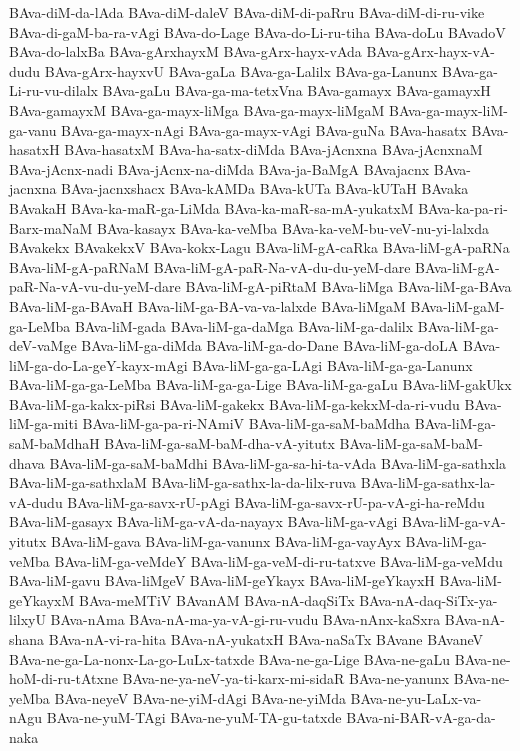 {BAva-diM-da-lAda
BAva-diM-daleV
BAva-diM-di-paRru
BAva-diM-di-ru-vike
BAva-di-gaM-ba-ra-vAgi
BAva-do-Lage
BAva-do-Li-ru-tiha
BAva-doLu
BAvadoV
BAva-do-lalxBa
BAva-gArxhayxM
BAva-gArx-hayx-vAda
BAva-gArx-hayx-vA-dudu
BAva-gArx-hayxvU
BAva-gaLa
BAva-ga-Lalilx
BAva-ga-Lanunx
BAva-ga-Li-ru-vu-dilalx
BAva-gaLu
BAva-ga-ma-tetxVna
BAva-gamayx
BAva-gamayxH
BAva-gamayxM
BAva-ga-mayx-liMga
BAva-ga-mayx-liMgaM
BAva-ga-mayx-liM-ga-vanu
BAva-ga-mayx-nAgi
BAva-ga-mayx-vAgi
BAva-guNa
BAva-hasatx
BAva-hasatxH
BAva-hasatxM
BAva-ha-satx-diMda
BAva-jAcnxna
BAva-jAcnxnaM
BAva-jAcnx-nadi
BAva-jAcnx-na-diMda
BAva-ja-BaMgA
BAvajacnx
BAva-jacnxna
BAva-jacnxshacx
BAva-kAMDa
BAva-kUTa
BAva-kUTaH
BAvaka
BAvakaH
BAva-ka-maR-ga-LiMda
BAva-ka-maR-sa-mA-yukatxM
BAva-ka-pa-ri-Barx-maNaM
BAva-kasayx
BAva-ka-veMba
BAva-ka-veM-bu-veV-nu-yi-lalxda
BAvakekx
BAvakekxV
BAva-kokx-Lagu
BAva-liM-gA-caRka
BAva-liM-gA-paRNa
BAva-liM-gA-paRNaM
BAva-liM-gA-paR-Na-vA-du-du-yeM-dare
BAva-liM-gA-paR-Na-vA-vu-du-yeM-dare
BAva-liM-gA-piRtaM
BAva-liMga
BAva-liM-ga-BAva
BAva-liM-ga-BAvaH
BAva-liM-ga-BA-va-va-lalxde
BAva-liMgaM
BAva-liM-gaM-ga-LeMba
BAva-liM-gada
BAva-liM-ga-daMga
BAva-liM-ga-dalilx
BAva-liM-ga-deV-vaMge
BAva-liM-ga-diMda
BAva-liM-ga-do-Dane
BAva-liM-ga-doLA
BAva-liM-ga-do-La-geY-kayx-mAgi
BAva-liM-ga-ga-LAgi
BAva-liM-ga-ga-Lanunx
BAva-liM-ga-ga-LeMba
BAva-liM-ga-ga-Lige
BAva-liM-ga-gaLu
BAva-liM-gakUkx
BAva-liM-ga-kakx-piRsi
BAva-liM-gakekx
BAva-liM-ga-kekxM-da-ri-vudu
BAva-liM-ga-miti
BAva-liM-ga-pa-ri-NAmiV
BAva-liM-ga-saM-baMdha
BAva-liM-ga-saM-baMdhaH
BAva-liM-ga-saM-baM-dha-vA-yitutx
BAva-liM-ga-saM-baM-dhava
BAva-liM-ga-saM-baMdhi
BAva-liM-ga-sa-hi-ta-vAda
BAva-liM-ga-sathxla
BAva-liM-ga-sathxlaM
BAva-liM-ga-sathx-la-da-lilx-ruva
BAva-liM-ga-sathx-la-vA-dudu
BAva-liM-ga-savx-rU-pAgi
BAva-liM-ga-savx-rU-pa-vA-gi-ha-reMdu
BAva-liM-gasayx
BAva-liM-ga-vA-da-nayayx
BAva-liM-ga-vAgi
BAva-liM-ga-vA-yitutx
BAva-liM-gava
BAva-liM-ga-vanunx
BAva-liM-ga-vayAyx
BAva-liM-ga-veMba
BAva-liM-ga-veMdeY
BAva-liM-ga-veM-di-ru-tatxve
BAva-liM-ga-veMdu
BAva-liM-gavu
BAva-liMgeV
BAva-liM-geYkayx
BAva-liM-geYkayxH
BAva-liM-geYkayxM
BAva-meMTiV
BAvanAM
BAva-nA-daqSiTx
BAva-nA-daq-SiTx-ya-lilxyU
BAva-nAma
BAva-nA-ma-ya-vA-gi-ru-vudu
BAva-nAnx-kaSxra
BAva-nA-shana
BAva-nA-vi-ra-hita
BAva-nA-yukatxH
BAva-naSaTx
BAvane
BAvaneV
BAva-ne-ga-La-nonx-La-go-LuLx-tatxde
BAva-ne-ga-Lige
BAva-ne-gaLu
BAva-ne-hoM-di-ru-tAtxne
BAva-ne-ya-neV-ya-ti-karx-mi-sidaR
BAva-ne-yanunx
BAva-ne-yeMba
BAva-neyeV
BAva-ne-yiM-dAgi
BAva-ne-yiMda
BAva-ne-yu-LaLx-va-nAgu
BAva-ne-yuM-TAgi
BAva-ne-yuM-TA-gu-tatxde
BAva-ni-BAR-vA-ga-da-naka
}
